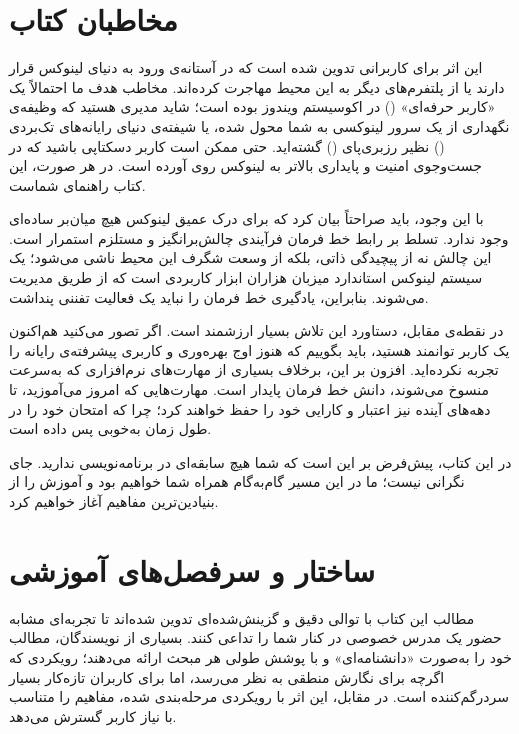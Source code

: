 \section*{مخاطبان کتاب}

این اثر برای کاربرانی تدوین شده است که در آستانه‌ی ورود به دنیای لینوکس قرار دارند یا از پلتفرم‌های دیگر به این محیط مهاجرت کرده‌اند. مخاطب هدف ما احتمالاً یک «کاربر حرفه‌ای» () در اکوسیستم ویندوز بوده است؛ شاید مدیری هستید که وظیفه‌ی نگهداری از یک سرور لینوکسی به شما محول شده، یا شیفته‌ی دنیای رایانه‌های تک‌بردی () نظیر رزبری‌پای () گشته‌اید. حتی ممکن است کاربر دسکتاپی باشید که در جست‌وجوی امنیت و پایداری بالاتر به لینوکس روی آورده است. در هر صورت، این کتاب راهنمای شماست.

با این وجود، باید صراحتاً بیان کرد که برای درک عمیق لینوکس هیچ میان‌بر ساده‌ای وجود ندارد. تسلط بر رابط خط فرمان فرآیندی چالش‌برانگیز و مستلزم استمرار است. این چالش نه از پیچیدگی ذاتی، بلکه از وسعت شگرف این محیط ناشی می‌شود؛ یک سیستم لینوکس استاندارد میزبان هزاران ابزار کاربردی است که از طریق  مدیریت می‌شوند. بنابراین، یادگیری خط فرمان را نباید یک فعالیت تفننی پنداشت.

در نقطه‌ی مقابل، دستاورد این تلاش بسیار ارزشمند است. اگر تصور می‌کنید هم‌اکنون یک کاربر توانمند هستید، باید بگوییم که هنوز اوج بهره‌وری و کاربری پیشرفته‌ی رایانه را تجربه نکرده‌اید. افزون بر این، برخلاف بسیاری از مهارت‌های نرم‌افزاری که به‌سرعت منسوخ می‌شوند، دانش خط فرمان پایدار است. مهارت‌هایی که امروز می‌آموزید، تا دهه‌های آینده نیز اعتبار و کارایی خود را حفظ خواهند کرد؛ چرا که  امتحان خود را در طول زمان به‌خوبی پس داده است.

در این کتاب، پیش‌فرض بر این است که شما هیچ سابقه‌ای در برنامه‌نویسی ندارید. جای نگرانی نیست؛ ما در این مسیر گام‌به‌گام همراه شما خواهیم بود و آموزش را از بنیادین‌ترین مفاهیم آغاز خواهیم کرد.

\section*{ساختار و سرفصل‌های آموزشی}

مطالب این کتاب با توالی دقیق و گزینش‌شده‌ای تدوین شده‌اند تا تجربه‌ای مشابه حضور یک مدرس خصوصی در کنار شما را تداعی کنند. بسیاری از نویسندگان، مطالب خود را به‌صورت «دانشنامه‌ای» و با پوشش طولی هر مبحث ارائه می‌دهند؛ رویکردی که اگرچه برای نگارش منطقی به نظر می‌رسد، اما برای کاربران تازه‌کار بسیار سردرگم‌کننده است. در مقابل، این اثر با رویکردی مرحله‌بندی شده، مفاهیم را متناسب با نیاز کاربر گسترش می‌دهد.


